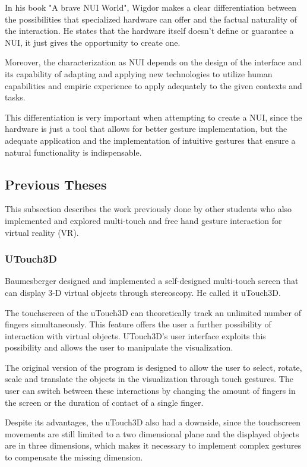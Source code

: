 \documentclass[12pt]{extarticle}
\begin{document}
In his book "A brave NUI World"\cite{NUIWorld}, Wigdor makes a clear differentiation between the possibilities that specialized hardware can offer and the factual naturality of the interaction. He states that the hardware itself doesn't define or guarantee a NUI, it just gives the opportunity to create one. 

Moreover, the characterization as NUI depends on the design of the interface and its capability of adapting and applying new technologies to utilize human capabilities and empiric experience to apply adequately to the given contexts and tasks.

This differentiation is very important when attempting to create a NUI, since the hardware is just a tool that allows for better gesture implementation, but the adequate application and the implementation of intuitive gestures that ensure a natural functionality is indispensable.

\subsection {Previous Theses}
This subsection describes the work previously done by other students who also implemented and explored multi-touch and free hand gesture interaction for virtual reality (VR).

\subsubsection {UTouch3D}
Baumesberger designed and implemented a self-designed multi-touch screen that can display 3-D virtual objects through stereoscopy. He called it uTouch3D\cite{Bau10,Deli13}.

The touchscreen of the uTouch3D can theoretically track an unlimited number of fingers simultaneously. This feature offers the user a further possibility of interaction with virtual objects. UTouch3D's user interface exploits this possibility and allows the user to manipulate the visualization.

The original version of the program \cite{Bau10} is designed to allow the user to select, rotate, scale and translate the objects in the visualization through touch gestures. The user can switch between these interactions by changing the amount of fingers in the screen or the duration of contact of a single finger.

Despite its advantages, the uTouch3D also had a downside, since the touchscreen movements are still limited to a two dimensional plane and the displayed objects are in three dimensions, which makes it necessary to implement complex gestures to compensate the missing dimension.
\end{document}
